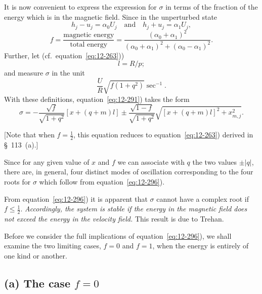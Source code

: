 It is now convenient to express the expression for $\sigma$ in terms of the fraction of the energy which is in the magnetic field. Since in the unperturbed state
\begin{equation}
\label{eq:12-292}
h_j - u_j = \alpha_0 U_j \quad \text{and} \quad h_j + u_j = \alpha_1 U_j,
\end{equation}
\begin{equation}
\label{eq:12-293}
f = \frac{\text{magnetic energy}}{\text{total energy}} = \frac{(\alpha_0+\alpha_1)^2}{(\alpha_0+\alpha_1)^2 + (\alpha_0-\alpha_1)^2}.
\end{equation}
Further, let (cf.\ equation~\eqref{eq:12-263}))
\begin{equation}
\label{eq:12-294}
l = R/p;
\end{equation}
and measure $\sigma$ in the unit
\begin{equation}
\label{eq:12-295}
\frac{U}{R}\sqrt{f(1+q^2)} \sec^{-1}.
\end{equation}
With these definitions, equation~\eqref{eq:12-291}) takes the form
\begin{equation}
\label{eq:12-296}
\sigma = -\frac{\sqrt{f}}{\sqrt{1+q^2}}[x + (q+m)l] \pm \frac{\sqrt{1-f}}{\sqrt{1+q^2}}\sqrt{[x+(q+m)l]^2 + x_{m,j}^2}.
\end{equation}

[Note that when $f = \frac{1}{2}$, this equation reduces to equation~\eqref{eq:12-263}) derived in \S~113~(a).]

Since for any given value of $x$ and $f$ we can associate with $q$ the two values $\pm|q|$, there are, in general, four distinct modes of oscillation corresponding to the four roots for $\sigma$ which follow from equation~\eqref{eq:12-296}).

From equation~\eqref{eq:12-296}) it is apparent that $\sigma$ cannot have a complex root if $f \leq \frac{1}{2}$. \emph{Accordingly, the system is stable if the energy in the magnetic field does not exceed the energy in the velocity field.} This result is due to Trehan.

Before we consider the full implications of equation~\eqref{eq:12-296}), we shall examine the two limiting cases, $f = 0$ and $f = 1$, when the energy is entirely of one kind or another.

\subsection*{(a) The case $f = 0$}

